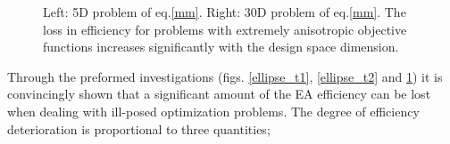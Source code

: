 \begin{figure}[h!]
\begin{minipage}[b]{0.5\linewidth}
 \centering
\end{minipage}
\begin{minipage}[b]{0.5\linewidth}
 \centering
\end{minipage}
\caption{Left: 5D problem of eq.\ref{mm}. Right: 30D problem of eq.\ref{mm}. The loss in efficiency for problems with extremely anisotropic objective functions increases significantly with the design space dimension.} 
\label{multimodres}
\end{figure}

Through the preformed investigations  (figs. \ref{ellipse_t1}, \ref{ellipse_t2} and \ref{multimodres}) it is convincingly shown  that a significant amount of the EA efficiency can be lost when dealing with ill-posed optimization problems. The degree of efficiency deterioration is proportional to three quantities;

